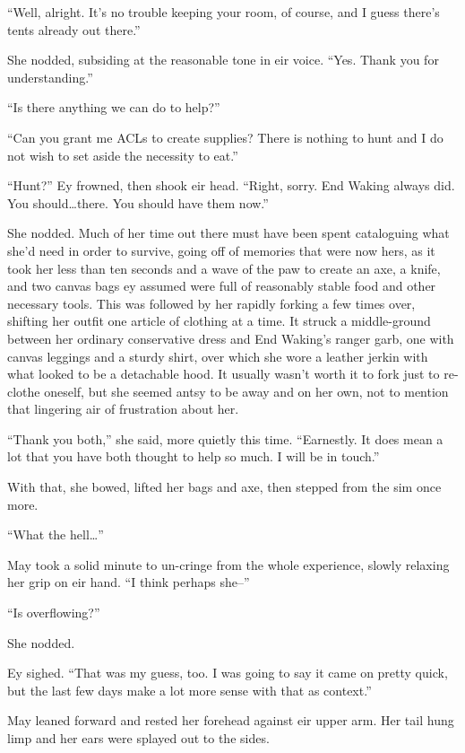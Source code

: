 ``Well, alright. It's no trouble keeping your room, of course, and I guess there's tents already out there.''

She nodded, subsiding at the reasonable tone in eir voice. ``Yes. Thank you for understanding.''

``Is there anything we can do to help?''

``Can you grant me ACLs to create supplies? There is nothing to hunt and I do not wish to set aside the necessity to eat.''

``Hunt?'' Ey frowned, then shook eir head. ``Right, sorry. End Waking always did. You should\ldots there. You should have them now.''

She nodded. Much of her time out there must have been spent cataloguing what she'd need in order to survive, going off of memories that were now hers, as it took her less than ten seconds and a wave of the paw to create an axe, a knife, and two canvas bags ey assumed were full of reasonably stable food and other necessary tools. This was followed by her rapidly forking a few times over, shifting her outfit one article of clothing at a time. It struck a middle-ground between her ordinary conservative dress and End Waking's ranger garb, one with canvas leggings and a sturdy shirt, over which she wore a leather jerkin with what looked to be a detachable hood. It usually wasn't worth it to fork just to re-clothe oneself, but she seemed antsy to be away and on her own, not to mention that lingering air of frustration about her.

``Thank you both,'' she said, more quietly this time. ``Earnestly. It does mean a lot that you have both thought to help so much. I will be in touch.''

With that, she bowed, lifted her bags and axe, then stepped from the sim once more.

``What the hell\ldots{}''

May took a solid minute to un-cringe from the whole experience, slowly relaxing her grip on eir hand. ``I think perhaps she--''

``Is overflowing?''

She nodded.

Ey sighed. ``That was my guess, too. I was going to say it came on pretty quick, but the last few days make a lot more sense with that as context.''

May leaned forward and rested her forehead against eir upper arm. Her tail hung limp and her ears were splayed out to the sides.

